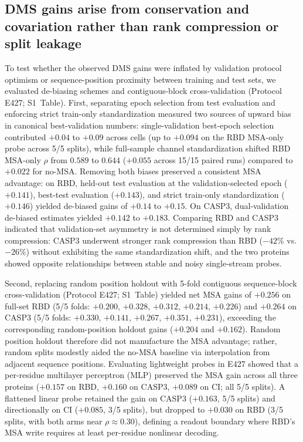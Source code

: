 \documentclass[10pt,a4paper]{article}
\begin{document}
\subsection{DMS gains arise from conservation and covariation rather than rank compression or split leakage}

To test whether the observed DMS gains were inflated by validation protocol optimism or sequence-position proximity between training and test sets, we evaluated de-biasing schemes and contiguous-block cross-validation (Protocol E427; S1~Table). First, separating epoch selection from test evaluation and enforcing strict train-only standardization measured two sources of upward bias in canonical best-validation numbers: single-validation best-epoch selection contributed $+0.04$ to $+0.09$ across cells (up to $+0.094$ on the RBD MSA-only probe across 5/5 splits), while full-sample channel standardization shifted RBD MSA-only $\rho$ from $0.589$ to $0.644$ ($+0.055$ across 15/15 paired runs) compared to $+0.022$ for no-MSA. Removing both biases preserved a consistent MSA advantage: on RBD, held-out test evaluation at the validation-selected epoch ($+0.141$), best-test evaluation ($+0.143$), and strict train-only standardization ($+0.146$) yielded de-biased gains of $+0.14$ to $+0.15$. On CASP3, dual-validation de-biased estimates yielded $+0.142$ to $+0.183$. Comparing RBD and CASP3 indicated that validation-set asymmetry is not determined simply by rank compression: CASP3 underwent stronger rank compression than RBD ($-42\%$ vs. $-26\%$) without exhibiting the same standardization shift, and the two proteins showed opposite relationships between stable and noisy single-stream probes.

Second, replacing random position holdout with 5-fold contiguous sequence-block cross-validation (Protocol E427; S1~Table) yielded net MSA gains of $+0.256$ on full-set RBD (5/5 folds: $+0.200$, $+0.328$, $+0.312$, $+0.214$, $+0.226$) and $+0.264$ on CASP3 (5/5 folds: $+0.330$, $+0.141$, $+0.267$, $+0.351$, $+0.231$), exceeding the corresponding random-position holdout gains ($+0.204$ and $+0.162$). Random position holdout therefore did not manufacture the MSA advantage; rather, random splits modestly aided the no-MSA baseline via interpolation from adjacent sequence positions. Evaluating lightweight probes in E427 showed that a per-residue multilayer perceptron (MLP) preserved the MSA gain across all three proteins ($+0.157$ on RBD, $+0.160$ on CASP3, $+0.089$ on CI; all 5/5 splits). A flattened linear probe retained the gain on CASP3 ($+0.163$, 5/5 splits) and directionally on CI ($+0.085$, 3/5 splits), but dropped to $+0.030$ on RBD (3/5 splits, with both arms near $\rho \approx 0.30$), defining a readout boundary where RBD's MSA write requires at least per-residue nonlinear decoding.
\end{document}
